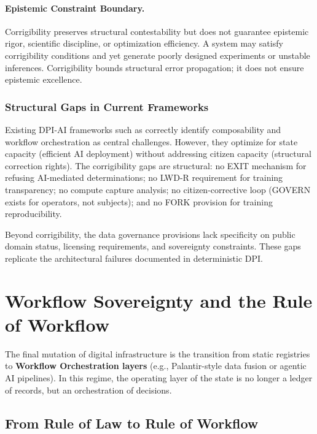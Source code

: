 \documentclass[11pt,a4paper]{article}
\theoremstyle{definition}
\begin{document}
\paragraph{Epistemic Constraint Boundary.} Corrigibility preserves structural contestability but does not guarantee epistemic rigor, scientific discipline, or optimization efficiency. A system may satisfy corrigibility conditions and yet generate poorly designed experiments or unstable inferences. Corrigibility bounds structural error propagation; it does not ensure epistemic excellence.

\subsubsection{Structural Gaps in Current Frameworks}
\label{subsec:cdpi-critique}

Existing DPI-AI frameworks such as \citep{abadie2026} correctly identify composability and workflow orchestration as central challenges. However, they optimize for state capacity (efficient AI deployment) without addressing citizen capacity (structural correction rights). The corrigibility gaps are structural: no EXIT mechanism for refusing AI-mediated determinations; no LWD-R requirement for training transparency; no compute capture analysis; no citizen-corrective loop (GOVERN exists for operators, not subjects); and no FORK provision for training reproducibility.

Beyond corrigibility, the data governance provisions lack specificity on public domain status, licensing requirements, and sovereignty constraints. These gaps replicate the architectural failures documented in deterministic DPI.


\section{Workflow Sovereignty and the Rule of Workflow}
\label{sec:workflow}

The final mutation of digital infrastructure is the transition from static registries to \textbf{Workflow Orchestration layers} (e.g., Palantir-style data fusion or agentic AI pipelines). In this regime, the operating layer of the state is no longer a ledger of records, but an orchestration of decisions.

\subsection{From Rule of Law to Rule of Workflow}
\end{document}
